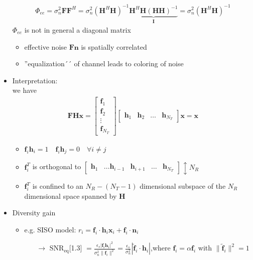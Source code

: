 \documentclass[a4paper, 10pt]{article}
\begin{document}
\begin{itemize}
\begin{align*}
	\Phi_{ee}=\sigma_n^2\mathbf{FF}^H=\sigma_n^2(\mathbf{H}^H\mathbf{H})^{-1}\underbrace{\mathbf{H}^H\mathbf{H}(\mathbf{H}\mathbf{H})^{-1}}_{\mathbf{I}}
	=\sigma_n^2(\mathbf{H}^H\mathbf{H})^{-1}
\end{align*}
$\Phi_{ee}$ is not in general a diagonal matrix
	\begin{itemize}
		\item effective noise $\mathbf{Fn}$ is spatially correlated
		\item ''equalization´´ of channel leads to coloring of noise
	\end{itemize}
	\item Interpretation:\\
	we have
	\begin{align*}
	\mathbf{FHx} = \begin{bmatrix*} \mathbf{f}_1 \\ \mathbf{f}_2 \\ \vdots \\  \mathbf{f}_{N_T}  \end{bmatrix*} \begin{bmatrix*} \mathbf{h}_1 & \mathbf{h}_2 &\dots & \mathbf{h}_{N_T}\end{bmatrix*}\mathbf{x}=\mathbf{x}	
	\end{align*}
	\begin{itemize}
		\item $\mathbf{f}_i\mathbf{h}_i=1 \quad \mathbf{f}_i\mathbf{h}_j=0 \quad \forall i \neq j$
		\item $\mathbf{f}_i^T$ is orthogonal to $\begin{bmatrix*} \mathbf{h}_1 & \dots \mathbf{h}_{i-1} & \mathbf{h}_{i+1} & \dots & \mathbf{h}_{N_T} \end{bmatrix*}
		\updownarrow N_R$
		\item $\mathbf{f}_i^T$ is confined to an $N_R-(N_T-1)$ dimensional subspace of the $N_R$ dimensional space spanned by $\mathbf{H}$ 
	\end{itemize}
	\item Diversity gain
	\begin{itemize}
		\item e.g. SISO model:  $ r_i = \mathbf{f}_i\cdot\mathbf{h}_i\mathbf{x}_i + \mathbf{f}_i\cdot\mathbf{n}_i $
		\begin{itemize}
			\item[$\rightarrow$] $ \text{SNR}_{\text{eq}} $\scalebox{1.3}[1.3]{ $= \frac{\epsilon_s|\mathbf{f}_i\mathbf{h}_i|^2}{\sigma_n^2\|\mathbf{f}_i\|^2} = \frac{\epsilon_s}{\sigma_n^2}\left | \tilde{\mathbf{f}}_i\cdot\mathbf{h}_i\right | $},\quad  where $\mathbf{f}_i =\alpha\mathbf{f}_i  $ with $\|\tilde{\mathbf{f}}_i \|^2 = 1$  

\end{itemize}
\end{itemize}
\end{itemize}
\end{document}
